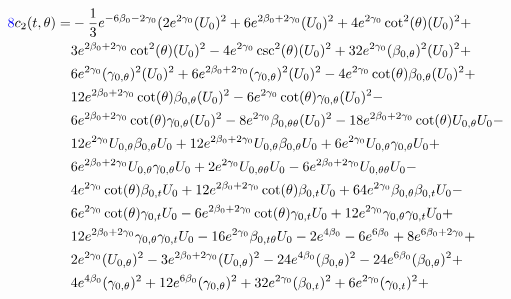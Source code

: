 \documentclass[a4paper,11pt]{article}
\numberwithin{equation}{section}
\begin{document}
\begin{subequations}
\begin{align}
\begin{split}
\textcolor{blue}{8}c_2(t, \theta) =& -\frac{1}{3} e^{-6\beta_{0}-2 \gamma_{0}} (2 e^{2 \gamma_{0}} (U_{0})^2+6 e^{2\beta_{0}+2 \gamma_{0}} (U_{0})^2+4 e^{2 \gamma_{0}} \cot ^2(\theta ) (U_{0})^2+\\
&3 e^{2\beta_{0}+2 \gamma_{0}} \cot ^2(\theta ) (U_{0})^2-4 e^{2 \gamma_{0}} \csc ^2(\theta ) (U_{0})^2+32 e^{2 \gamma_{0}} (\beta_{0, \theta})^2 (U_{0})^2+\\
&6 e^{2 \gamma_{0}} (\gamma_{0, \theta})^2 (U_{0})^2+6 e^{2\beta_{0}+2 \gamma_{0}} (\gamma_{0, \theta})^2 (U_{0})^2-4 e^{2 \gamma_{0}} \cot (\theta )\beta_{0, \theta} (U_{0})^2+\\
&12 e^{2\beta_{0}+2 \gamma_{0}} \cot (\theta )\beta_{0, \theta} (U_{0})^2-6 e^{2 \gamma_{0}} \cot (\theta ) \gamma_{0, \theta} (U_{0})^2-\\
&6 e^{2\beta_{0}+2 \gamma_{0}} \cot (\theta ) \gamma_{0, \theta} (U_{0})^2-8 e^{2 \gamma_{0}}\beta_{0, \theta \theta} (U_{0})^2-18 e^{2\beta_{0}+2 \gamma_{0}} \cot (\theta ) U_{0, \theta} U_{0}-\\
&12 e^{2 \gamma_{0}} U_{0, \theta}\beta_{0, \theta} U_{0}+12 e^{2\beta_{0}+2 \gamma_{0}} U_{0, \theta}\beta_{0, \theta} U_{0}+6 e^{2 \gamma_{0}} U_{0, \theta} \gamma_{0, \theta} U_{0}+\\
&6 e^{2\beta_{0}+2 \gamma_{0}} U_{0, \theta} \gamma_{0, \theta} U_{0}+2 e^{2 \gamma_{0}} U_{0, \theta \theta} U_{0}-6 e^{2\beta_{0}+2 \gamma_{0}} U_{0, \theta \theta} U_{0}-\\
&4 e^{2 \gamma_{0}} \cot (\theta )\beta_{0, t} U_{0}+12 e^{2\beta_{0}+2 \gamma_{0}} \cot (\theta )\beta_{0, t} U_{0}+64 e^{2 \gamma_{0}}\beta_{0, \theta}\beta_{0, t} U_{0}-\\
&6 e^{2 \gamma_{0}} \cot (\theta ) \gamma_{0, t} U_{0}-6 e^{2\beta_{0}+2 \gamma_{0}} \cot (\theta ) \gamma_{0, t} U_{0}+12 e^{2 \gamma_{0}} \gamma_{0, \theta} \gamma_{0, t} U_{0}+\\
&12 e^{2\beta_{0}+2 \gamma_{0}} \gamma_{0, \theta} \gamma_{0, t} U_{0}-16 e^{2 \gamma_{0}}\beta_{0, t \theta} U_{0}-2 e^{4\beta_{0}}-6 e^{6\beta_{0}}+8 e^{6\beta_{0}+2 \gamma_{0}}+\\
&2 e^{2 \gamma_{0}} (U_{0, \theta})^2-3 e^{2\beta_{0}+2 \gamma_{0}} (U_{0, \theta})^2-24 e^{4\beta_{0}} (\beta_{0, \theta})^2-24 e^{6\beta_{0}} (\beta_{0, \theta})^2+\\
&4 e^{4\beta_{0}} (\gamma_{0, \theta})^2+12 e^{6\beta_{0}} (\gamma_{0, \theta})^2+32 e^{2 \gamma_{0}} (\beta_{0, t})^2+6 e^{2 \gamma_{0}} (\gamma_{0, t})^2+\\

\end{split}
\end{align}
\end{subequations}
\end{document}
